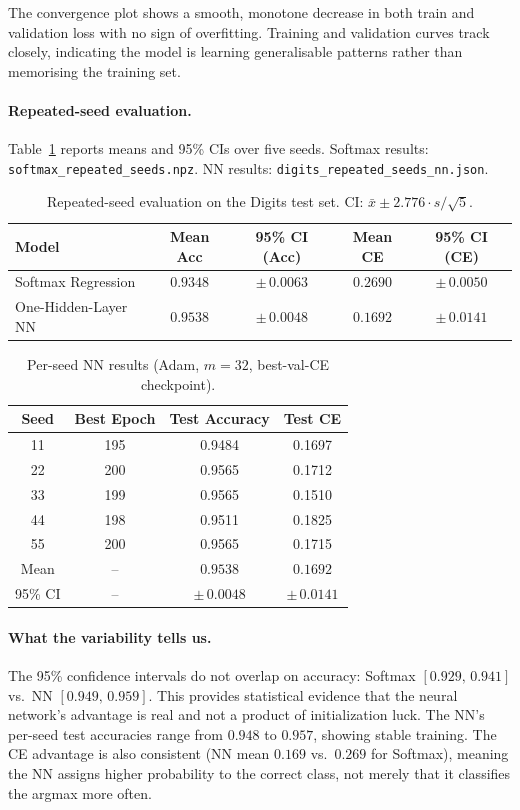 \documentclass[11pt]{article}
\begin{document}
The convergence plot shows a smooth, monotone decrease in both train and
validation loss with no sign of overfitting.
Training and validation curves track closely, indicating the model is learning
generalisable patterns rather than memorising the training set.

\paragraph{Repeated-seed evaluation.}
Table~\ref{tab:repeated_seed} reports means and 95\% CIs over five seeds.
Softmax results: \texttt{softmax\_repeated\_seeds.npz}.
NN results: \texttt{digits\_repeated\_seeds\_nn.json}.

\begin{table}[H]
\centering
\caption{Repeated-seed evaluation on the Digits test set.
         CI: $\bar{x}\pm2.776\cdot s/\!\sqrt{5}$.}
\label{tab:repeated_seed}
\renewcommand{\arraystretch}{1.4}
\begin{tabular}{lcccc}
\toprule
Model & Mean Acc & 95\% CI (Acc) & Mean CE & 95\% CI (CE) \\
\midrule
Softmax Regression  & $0.9348$ & $\pm\,0.0063$ & $0.2690$ & $\pm\,0.0050$ \\
One-Hidden-Layer NN & $0.9538$ & $\pm\,0.0048$ & $0.1692$ & $\pm\,0.0141$ \\
\bottomrule
\end{tabular}
\end{table}

\begin{table}[H]
\centering
\caption{Per-seed NN results (Adam, $m=32$, best-val-CE checkpoint).}
\label{tab:nn_seeds}
\renewcommand{\arraystretch}{1.25}
\begin{tabular}{cccc}
\toprule
Seed & Best Epoch & Test Accuracy & Test CE \\
\midrule
11 & 195 & 0.9484 & 0.1697 \\
22 & 200 & 0.9565 & 0.1712 \\
33 & 199 & 0.9565 & 0.1510 \\
44 & 198 & 0.9511 & 0.1825 \\
55 & 200 & 0.9565 & 0.1715 \\
\midrule
Mean & -- & $\mathbf{0.9538}$ & $\mathbf{0.1692}$ \\
95\% CI & -- & $\pm\,0.0048$ & $\pm\,0.0141$ \\
\bottomrule
\end{tabular}
\end{table}

\paragraph{What the variability tells us.}
The 95\% confidence intervals do not overlap on accuracy:
Softmax $[0.929,\,0.941]$ vs.\ NN $[0.949,\,0.959]$.
This provides statistical evidence that the neural network's advantage is real
and not a product of initialization luck.
The NN's per-seed test accuracies range from $0.948$ to $0.957$, showing
stable training.
The CE advantage is also consistent (NN mean $0.169$ vs.\ $0.269$ for Softmax),
meaning the NN assigns higher probability to the correct class, not merely that
it classifies the argmax more often.
\end{document}
